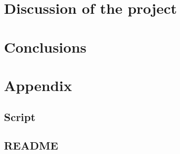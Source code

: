 \documentclass[a4paper,12pt]{report}
\begin{document}
\chapter{Discussion of the project}


\chapter{Conclusions}



\chapter{Appendix}

\section{Script}

\section{README}
\end{document}
